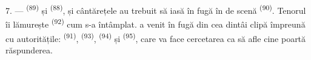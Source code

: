 7. ---  \textsuperscript{(89)} și 
\textsuperscript{(88)},  și cântărețele au trebuit să iasă în
fugă în  de scenă \textsuperscript{(90)}. Tenorul îi lămurește
 \textsuperscript{(92)} cum s-a întâmplat.
 a venit în fugă din cea dintâi clipă împreună cu autoritățile:
 \textsuperscript{(91)}, 
\textsuperscript{(93)},  \textsuperscript{(94)} și
 \textsuperscript{(95)}, care va face cercetarea
ca să afle cine poartă răspunderea.
\VUsaut{6.0mm}
\VUfilet{22mm}
